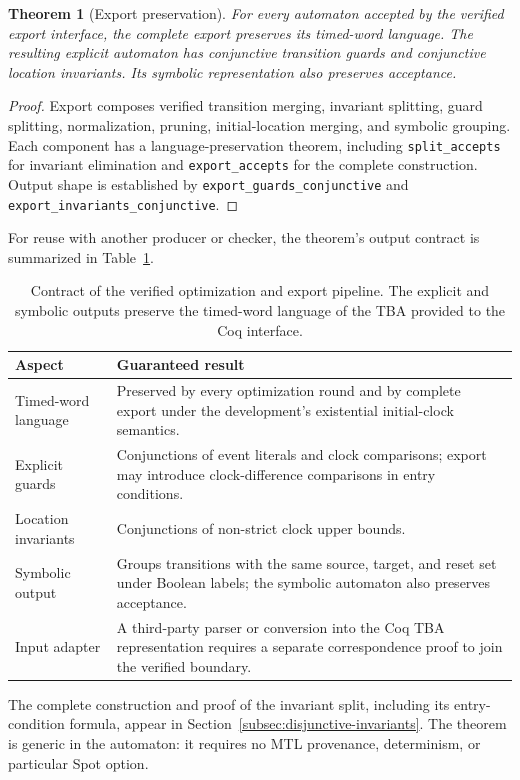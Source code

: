 \documentclass{ieeeaccess}
\newtheorem{theorem}{Theorem}[section]
\begin{document}
\begin{theorem}[Export preservation]
\label{thm:export}
For every automaton accepted by the verified export interface, the complete export preserves its timed-word language. The resulting explicit automaton has conjunctive transition guards and conjunctive location invariants. Its symbolic representation also preserves acceptance.
\end{theorem}
\begin{proof}
Export composes verified transition merging, invariant splitting, guard splitting, normalization, pruning, initial-location merging, and symbolic grouping. Each component has a language-preservation theorem, including \texttt{split\_accepts} for invariant elimination and \texttt{export\_accepts} for the complete construction. Output shape is established by \texttt{export\_guards\_conjunctive} and \texttt{export\_invariants\_conjunctive}.
\end{proof}
For reuse with another producer or checker, the theorem's output contract is
summarized in Table~\ref{tab:export-contract}.
\begin{table}[t]
\centering
\caption{Contract of the verified optimization and export pipeline. The
explicit and symbolic outputs preserve the timed-word language of the TBA
provided to the Coq interface.}
\label{tab:export-contract}
\small
\begin{tabular}{@{}p{}p{}@{}}
\toprule
Aspect & Guaranteed result\\
\midrule
Timed-word language & Preserved by every optimization round and by complete export under the development's existential initial-clock semantics.\\
Explicit guards & Conjunctions of event literals and clock comparisons; export may introduce clock-difference comparisons in entry conditions.\\
Location invariants & Conjunctions of non-strict clock upper bounds.\\
Symbolic output & Groups transitions with the same source, target, and reset set under Boolean labels; the symbolic automaton also preserves acceptance.\\
Input adapter & A third-party parser or conversion into the Coq TBA representation requires a separate correspondence proof to join the verified boundary.\\
\bottomrule
\end{tabular}
\end{table}
The complete construction and proof of the invariant split, including its entry-condition formula, appear in Section~\ref{subsec:disjunctive-invariants}. The theorem is generic in the automaton: it requires no MTL provenance, determinism, or particular Spot option.
\end{document}
